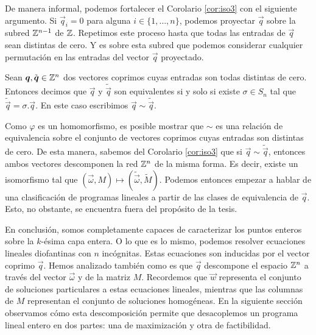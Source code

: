 De manera informal, podemos fortalecer el Corolario \ref{cor:iso3} con el siguiente argumento. Si
$\vec{q}_i = 0$ para alguna $i \in \lbrace 1, \ldots, n \rbrace$, podemos proyectar $\vec{q}$ sobre
la subred $\mathbb{Z}^{n-1}$ de $\mathbb{Z}$. Repetimos este proceso hasta que todas las entradas de $\vec{q}$ sean
distintas de cero. Y es sobre esta subred que podemos considerar cualquier permutación en las
entradas del vector $\vec{q}$ proyectado.
\begin{definition}
	Sean $\boldsymbol{q}, \tilde{\boldsymbol{q}} \in \mathbb{Z}^n$ dos vectores coprimos cuyas entradas son todas
	distintas de cero. Entonces decimos que $\vec{q}$ y $\tilde{\vec{q}}$ son equivalentes si y solo
	si existe $\sigma \in S_n$ tal que $\tilde{\vec{q}} = \sigma.\vec{q}$. En este caso escribimos
	$\vec{q} \sim \tilde{\vec{q}}$.
\end{definition}
Como $\varphi$ es un homomorfismo, es posible mostrar que $\sim$ es una relación de equivalencia
sobre el conjunto de vectores coprimos cuyas entradas son distintas de cero. De esta manera, sabemos
del Corolario \ref{cor:iso3} que si $\vec{q} \sim \tilde{\vec{q}}$, entonces ambos vectores
descomponen la red $\mathbb{Z}^n$ de la misma forma. Es decir, existe un isomorfismo tal que $(\vec{\omega},
M) \mapsto (\tilde{\vec{\omega}}, \tilde{M})$. Podemos entonces empezar a hablar de una
clasificación de programas lineales a partir de las clases de equivalencia de $\vec{q}$. Esto, no
obstante, se encuentra fuera del propósito de la tesis.

En conclusión, somos completamente capaces de caracterizar los puntos enteros sobre la $k$-ésima
capa entera. O lo que es lo mismo, podemos resolver ecuaciones lineales diofantinas con $n$
incógnitas. Estas ecuaciones son inducidas por el vector coprimo $\vec{q}$. Hemos analizado también
como es que $\vec{q}$ descompone el espacio $\mathbb{Z}^n$ a través del vector $\vec{\omega}$ y de la matriz
$M$. Recordemos que $\vec{w}$ representa el conjunto de soluciones particulares a estas ecuaciones
lineales, mientras que las columnas de $M$ representan el conjunto de soluciones homogéneas. En la
siguiente sección observamos cómo esta descomposición permite que desacoplemos un programa lineal
entero en dos partes: una de maximización y otra de factibilidad.

